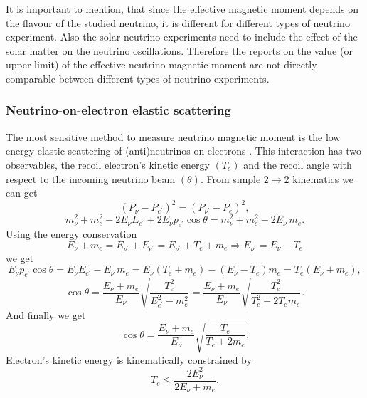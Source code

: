 It is important to mention, that since the effective magnetic moment depends on the flavour of the studied neutrino, it is different for different types of neutrino experiment. Also the solar neutrino experiments need to include the effect of the solar matter on the neutrino oscillations. Therefore the reports on the value (or upper limit) of the effective neutrino magnetic moment are not directly comparable between different types of neutrino experiments.

\subsubsection{Neutrino-on-electron elastic scattering}
The most sensitive method to measure neutrino magnetic moment is the low energy elastic scattering of (anti)neutrinos on electrons \cite{nuElmagInt2015.pdf}. This interaction has two observables, the recoil electron's kinetic energy $\left(T_e\right)$ and the recoil angle with respect to the incoming neutrino beam $\left(\theta\right)$. From simple $2\rightarrow 2$ kinematics we can get
\begin{equation}
\left(P_{\nu}-P_{e^{\prime}}\right)^2=\left(P_{\nu^{\prime}}-P_e\right)^2,
\end{equation}
\begin{equation}
m_{\nu}^2+m_e^2-2E_{\nu}E_{e^{\prime}}+2E_{\nu}p_{e^{\prime}}\cos\theta=m_{\nu}^2+m_e^2-2E_{\nu^{\prime}}m_e.
\end{equation}
Using the energy conservation
\begin{equation}
E_{\nu}+m_e=E_{\nu^{\prime}}+E_{e^{\prime}}=E_{\nu^{\prime}}+T_e+m_e\Rightarrow E_{\nu^{\prime}}=E_{\nu}-T_e
\end{equation}
we get
\begin{equation}
E_{\nu}p_{e^{\prime}}\cos\theta=E_{\nu}E_{e^{\prime}}-E_{\nu^{\prime}}m_e=E_{\nu}\left(T_e+m_e\right)-\left(E_{\nu}-T_e\right)m_e=T_e\left(E_{\nu}+m_e\right),
\end{equation}
\begin{equation}
\cos\theta=\frac{E_{\nu}+m_e}{E_{\nu}}\sqrt{\frac{T_e^2}{E_{e^{\prime}}^2-m_e^2}}=\frac{E_{\nu}+m_e}{E_{\nu}}\sqrt{\frac{T_e^2}{T_e^2+2T_em_e}}.
\end{equation}
And finally we get
\begin{equation}\label{eqThetaTRelation}
\cos\theta=\frac{E_{\nu}+m_e}{E_{\nu}}\sqrt{\frac{T_e}{T_e+2m_e}}.
\end{equation}
Electron's kinetic energy is kinematically constrained by
\begin{equation}
T_e\leq\frac{2E_{\nu}^2}{2E_{\nu}+m_e}.
\end{equation}

